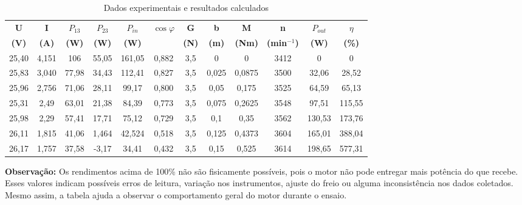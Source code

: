 \documentclass[12pt,a4paper]{article}
\begin{document}
\begin{table}[H]
\centering
\caption{Dados experimentais e resultados calculados}
\vspace{0.2cm}

\renewcommand{\arraystretch}{1.2}
\setlength{\tabcolsep}{2pt}
\scriptsize
\begin{tabular}{|c|c|c|c|c|c|c|c|c|c|c|c|}
\hline
\textbf{U} & \textbf{I} & \textbf{$P_{13}$} & \textbf{$P_{23}$} & \textbf{$P_{in}$} & \textbf{$\cos\varphi$} & \textbf{G} & \textbf{b} & \textbf{M} & \textbf{n} & \textbf{$P_{out}$} & \textbf{$\eta$} \\
\textbf{(V)} & \textbf{(A)} & \textbf{(W)} & \textbf{(W)} & \textbf{(W)} &  & \textbf{(N)} & \textbf{(m)} & \textbf{(Nm)} & \textbf{(min$^{-1}$)} & \textbf{(W)} & \textbf{(\%)} \\
\hline
25,40 & 4,151 & 106 & 55,05 & 161,05 & 0,882 & 3,5 & 0 & 0 & 3412 & 0 & 0 \\
\hline
25,83 & 3,040 & 77,98 & 34,43 & 112,41 & 0,827 & 3,5 & 0,025 & 0,0875 & 3500 & 32,06 & 28,52 \\
\hline
25,96 & 2,756 & 71,06 & 28,11 & 99,17 & 0,800 & 3,5 & 0,05 & 0,175 & 3525 & 64,59 & 65,13 \\
\hline
25,31 & 2,49 & 63,01 & 21,38 & 84,39 & 0,773 & 3,5 & \cellcolor{red!85}0,075 & 0,2625 & 3548 & 97,51 & \cellcolor{red!85}115,55 \\
\hline
25,98 & 2,29 & 57,41 & 17,71 & 75,12 & 0,729 & 3,5 & \cellcolor{red!85}0,1 & 0,35 & 3562 & 130,53 & \cellcolor{red!85}173,76 \\
\hline
26,11 & 1,815 & 41,06 & 1,464 & 42,524 & 0,518 & 3,5 & \cellcolor{red!85}0,125 & 0,4373 & 3604 & 165,01 & \cellcolor{red!85}388,04 \\
\hline
26,17 & 1,757 & 37,58 & -3,17 & 34,41 & 0,432 & 3,5 & \cellcolor{red!85}0,15 & 0,525 & 3614 & 198,65 & \cellcolor{red!85}577,31 \\
\hline
\end{tabular}

\end{table}

\vspace{0.3cm}

\noindent\textbf{Observação:} Os rendimentos acima de 100\% não são fisicamente possíveis, pois o motor não pode entregar mais potência do que recebe. Esses valores indicam possíveis erros de leitura, variação nos instrumentos, ajuste do freio ou alguma inconsistência nos dados coletados. Mesmo assim, a tabela ajuda a observar o comportamento geral do motor durante o ensaio.
\end{document}
